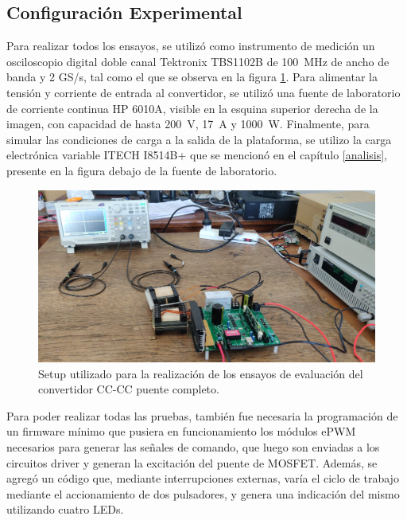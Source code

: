 \subsection{Configuración Experimental}

Para realizar todos los ensayos, se utilizó como instrumento de medición un osciloscopio digital doble canal Tektronix TBS1102B de \SI[]{100}{\mega\hertz} de ancho de banda y 2 GS/s, tal como el que se observa en la figura \ref{test_setup}. Para alimentar la tensión y corriente de entrada al convertidor, se utilizó una fuente de laboratorio de corriente continua HP 6010A, visible en la esquina superior derecha de la imagen, con capacidad de hasta \SI[]{200}{\volt}, \SI[]{17}{\ampere} y \SI[]{1000}{\watt}. Finalmente, para simular las condiciones de carga a la salida de la plataforma, se utilizo la carga electrónica variable ITECH I8514B+ que se mencionó en el capítulo \ref{analisis}, presente en la figura debajo de la fuente de laboratorio.\\

\begin{figure}[h]
    \centering
    \includegraphics[scale=0.09]{Imagenes/Setup Ensayo.jpg}
    \caption{Setup utilizado para la realización de los ensayos de evaluación del convertidor CC-CC puente completo.}
    \label{test_setup}
\end{figure}

Para poder realizar todas las pruebas, también fue necesaria la programación de un firmware mínimo que pusiera en funcionamiento los módulos ePWM necesarios para generar las señales de comando, que luego son enviadas a los circuitos driver y generan la excitación del puente de MOSFET. Además, se agregó un código que, mediante interrupciones externas, varía el ciclo de trabajo mediante el accionamiento de dos pulsadores, y genera una indicación del mismo utilizando cuatro LEDs.\\

